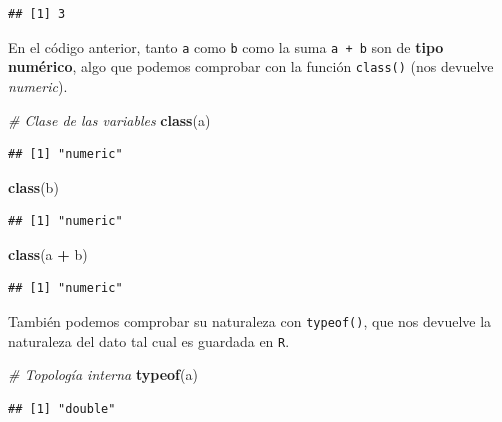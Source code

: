 \documentclass[11pt,]{book}
\newenvironment{Shaded}{\begin{snugshade}}{\end{snugshade}}
\newcommand{\CommentTok}[1]{\textcolor[rgb]{0.37,0.37,0.37}{\textit{#1}}}
\newcommand{\KeywordTok}[1]{\textcolor[rgb]{0.27,0.27,0.27}{\textbf{#1}}}
\newcommand{\NormalTok}[1]{#1}
\newcommand{\OperatorTok}[1]{\textcolor[rgb]{0.43,0.43,0.43}{\textbf{#1}}}
\newcommand{\StringTok}[1]{\textcolor[rgb]{0.5,0.5,0.5}{#1}}
\begin{document}
\begin{verbatim}
## [1] 3
\end{verbatim}

En el código anterior, tanto \texttt{a} como \texttt{b} como la suma \texttt{a\ +\ b} son de \textbf{tipo numérico}, algo que podemos comprobar con la función \texttt{class()} (nos devuelve \emph{numeric}).

\begin{Shaded}
\begin{Highlighting}[]
\CommentTok{# Clase de las variables}
\KeywordTok{class}\NormalTok{(a)}
\end{Highlighting}
\end{Shaded}

\begin{verbatim}
## [1] "numeric"
\end{verbatim}

\begin{Shaded}
\begin{Highlighting}[]
\KeywordTok{class}\NormalTok{(b)}
\end{Highlighting}
\end{Shaded}

\begin{verbatim}
## [1] "numeric"
\end{verbatim}

\begin{Shaded}
\begin{Highlighting}[]
\KeywordTok{class}\NormalTok{(a }\OperatorTok{+}\StringTok{ }\NormalTok{b)}
\end{Highlighting}
\end{Shaded}

\begin{verbatim}
## [1] "numeric"
\end{verbatim}

También podemos comprobar su naturaleza con \texttt{typeof()}, que nos devuelve la naturaleza del dato tal cual es guardada en \texttt{R}.

\begin{Shaded}
\begin{Highlighting}[]
\CommentTok{# Topología interna}
\KeywordTok{typeof}\NormalTok{(a)}
\end{Highlighting}
\end{Shaded}

\begin{verbatim}
## [1] "double"
\end{verbatim}
\end{document}
